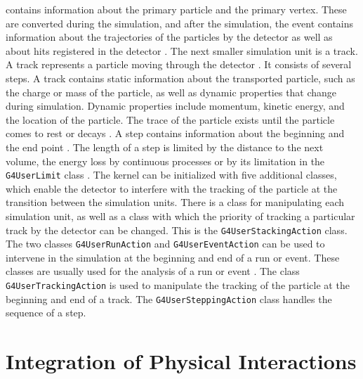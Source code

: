\documentclass[12pt, a4paper]{thesis}
\begin{document}
contains information about the primary particle and the primary
vertex. These are converted during the simulation, and after the
simulation, the event contains information about the trajectories of
the particles by the detector as well as about hits registered in the
detector \cite{geant_simul_toolkit}. The next smaller simulation unit
is a track. A track represents a particle moving through the detector
\cite{geant4-doc}. It consists of several steps. A track contains
static information about the transported particle, such as the charge
or mass of the particle, as well as dynamic properties that change
during simulation. Dynamic properties include momentum, kinetic
energy, and the location of the particle. The trace of the particle
exists until the particle comes to rest or decays \cite{geant4-doc}. A
step contains information about the beginning and the end point
\cite{geant4-doc}. The length of a step is limited by the distance to
the next volume, the energy loss by continuous processes or by its
limitation in the \texttt{G4UserLimit} class
\cite{geant_simul_toolkit}.  The kernel can be initialized with five
additional classes, which enable the detector to interfere with the
tracking of the particle at the transition between the simulation
units. There is a class for manipulating each simulation unit, as well
as a class with which the priority of tracking a particular track by
the detector can be changed. This is the \texttt{G4UserStackingAction}
class. The two classes \texttt{G4UserRunAction} and
\texttt{G4UserEventAction} can be used to intervene in the simulation
at the beginning and end of a run or event. These classes are usually
used for the analysis of a run or event \cite{geant4-doc}. The class
\texttt{G4UserTrackingAction} is used to manipulate the tracking of
the particle at the beginning and end of a track. The
\texttt{G4UserSteppingAction} class handles the sequence of a step.

\clearpage
\section{Integration of Physical Interactions}
\label{sec:org40783eb}
\end{document}
